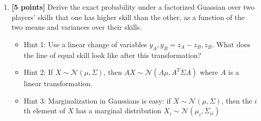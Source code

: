 \documentclass{article}
\begin{document}
\begin{enumerate}[label=(\alph*)]
\pagebreak

\item {\bf [5 points]} Derive the exact probability under a factorized Guassian over two players' skills that one has higher skill than the other, as a function of the two means and variances over their skills.
\begin{itemize}
\item Hint 1: Use a linear change of variables $y_A, y_B = z_A - z_B, z_B$.  What does the line of equal skill look like after this transformation?
\item Hint 2: If $X \sim \mathcal{N}(\mu, \Sigma)$, then $AX \sim \mathcal{N}(A \mu, A^{T} \Sigma A)$ where $A$ is a linear transformation.
\item Hint 3: Marginalization in Gaussians is easy: if $X \sim \mathcal{N}(\mu, \Sigma)$, then the $i$th element of $X$ has a marginal distribution $X_i \sim \mathcal{N}(\mu_i, \Sigma_{ii})$


\end{itemize}
\end{enumerate}
\end{document}
